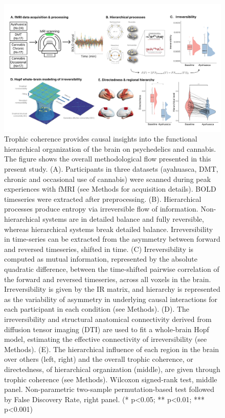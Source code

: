 \begin{figure}[h!]
    \centering
    \includegraphics[width=\textwidth]{images/Figure 1.png}
    \caption[Trophic coherence provides causal insights into
the functional hierarchical organization of the brain on drugs]{Trophic coherence provides causal insights into
the functional hierarchical organization of the brain on psychedelics and cannabis. The
figure shows the overall methodological flow presented in this present
study. (A). Participants in three datasets (ayahuasca, DMT, chronic and occasional use of cannabis) were scanned during peak experiences with fMRI (see Methods for acquisition details). BOLD timeseries were extracted after preprocessing. 
(B). Hierarchical processes produce entropy via
irreversible flow of information. Non-hierarchical systems are in
detailed balance and fully reversible, whereas hierarchical systems
break detailed balance. Irreversibility in time-series can be extracted from the
asymmetry between forward and reversed timeseries, shifted in time.
(C) Irreversibility is computed as mutual information, represented by the
absolute quadratic difference, between the time-shifted pairwise
correlation of the forward and reversed timeseries, across all voxels in
the brain. Irreversibility is given by the IR matrix, and hierarchy is
represented as the variability of asymmetry in underlying causal
interactions for each participant in each condition (see Methods).
(D). The irreversibility and structural
anatomical connectivity derived from diffusion tensor imaging (DTI) are used to fit a whole-brain Hopf model, estimating the effective connectivity of irreversibility (see Methods).
(E). The hierarchical influence of each
region in the brain over others (left, right) and the overall trophic coherence, or directedness, of
hierarchical organization (middle), are given through trophic coherence (see Methods). Wilcoxon signed-rank test, middle panel. Non-parametric
two-sample permutation-based test followed by False Discovery Rate,
right panel. (* p\textless0.05; ** p\textless0.01; *** p\textless0.001)}
    \label{fig:overview}
\end{figure}

